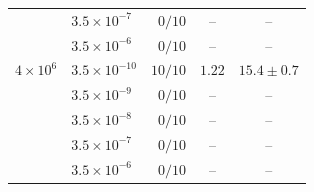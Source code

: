 \begin{table}[htbp]
{\begin{tabular}{llrrr}
 & $3.5 \times 10^{-7}$ & $0/10$ & \multicolumn{1}{c}{--} & \multicolumn{1}{c}{--} \\
 & $3.5 \times 10^{-6}$ & $0/10$ & \multicolumn{1}{c}{--} & \multicolumn{1}{c}{--} \\
\midrule
$4 \times 10^{6}$ & $3.5 \times 10^{-10}$ & $10/10$ & $1.22$ & $15.4 \pm 0.7$ \\
 & $3.5 \times 10^{-9}$ & $0/10$ & \multicolumn{1}{c}{--} & \multicolumn{1}{c}{--} \\
 & $3.5 \times 10^{-8}$ & $0/10$ & \multicolumn{1}{c}{--} & \multicolumn{1}{c}{--} \\
 & $3.5 \times 10^{-7}$ & $0/10$ & \multicolumn{1}{c}{--} & \multicolumn{1}{c}{--} \\
 & $3.5 \times 10^{-6}$ & $0/10$ & \multicolumn{1}{c}{--} & \multicolumn{1}{c}{--} \\
\bottomrule
\end{tabular}
}
\end{table}
